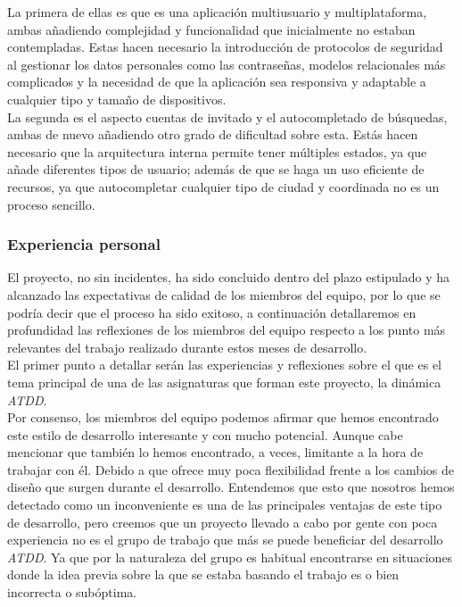 \documentclass[../ei103948-project-documentation.tex]{subfiles}
\begin{document}
        La primera de ellas es que es una aplicación multiusuario y multiplataforma, ambas añadiendo complejidad y funcionalidad que inicialmente no estaban contempladas. Estas hacen necesario la introducción de protocolos de seguridad al gestionar los datos personales como las contraseñas, modelos relacionales más complicados y la necesidad de que la aplicación sea responsiva y adaptable a cualquier tipo y tamaño de dispositivos.\\
        
        La segunda es el aspecto cuentas de invitado y el autocompletado de búsquedas, ambas de nuevo añadiendo otro grado de dificultad sobre esta. Estás hacen necesario que la arquitectura interna permite tener múltiples estados, ya que añade diferentes tipos de usuario; además de que se haga un uso eficiente de recursos, ya que autocompletar cualquier tipo de ciudad y coordinada no es un proceso sencillo.

        \subsubsection{Experiencia personal}
        El proyecto, no sin incidentes, ha sido concluido dentro del plazo estipulado y ha alcanzado las expectativas de calidad de los miembros del equipo, por lo que se podría decir que el proceso ha sido exitoso, a continuación detallaremos en profundidad las reflexiones de los miembros del equipo respecto a los punto más relevantes del trabajo realizado durante estos meses de desarrollo.\\

        El primer punto a detallar serán las experiencias y reflexiones sobre el que es el tema principal de una de las asignaturas que forman este proyecto, la dinámica \textit{ATDD}.\\

        Por consenso, los miembros del equipo podemos afirmar que hemos encontrado este estilo de desarrollo interesante y con mucho potencial. Aunque cabe mencionar que también lo hemos encontrado, a veces, limitante a la hora de trabajar con él. Debido a que ofrece muy poca flexibilidad frente a los cambios de diseño que surgen durante el desarrollo. Entendemos que esto que nosotros hemos detectado como un inconveniente es una de las principales ventajas de este tipo de desarrollo, pero creemos que un proyecto llevado a cabo por gente con poca experiencia no es el grupo de trabajo que más se puede beneficiar del desarrollo \textit{ATDD}. Ya que por la naturaleza del grupo es habitual encontrarse en situaciones donde la idea previa sobre la que se estaba basando el trabajo es o bien incorrecta o subóptima.\\
\end{document}
